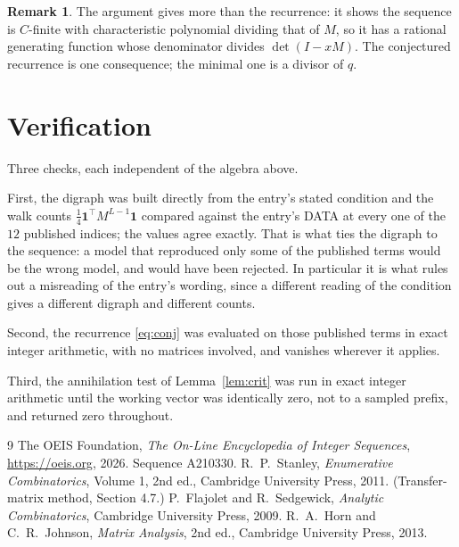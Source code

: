 \documentclass[11pt,a4paper]{article}
\theoremstyle{plain}
\theoremstyle{definition}
\newtheorem{remark}[theorem]{Remark}
\begin{document}
\begin{remark}
The argument gives more than the recurrence: it shows the sequence is $C$-finite with
characteristic polynomial dividing that of $M$, so it has a rational generating function
whose denominator divides $\det(I-xM)$. The conjectured recurrence is one consequence; the
minimal one is a divisor of $q$.
\end{remark}

\section{Verification}

Three checks, each independent of the algebra above.

First, the digraph was built directly from the entry's stated condition and the walk counts
$\tfrac1{4}\mathbf{1}^{\!\top}M^{L-1}\mathbf{1}$ compared against the entry's DATA at
every one of the $12$ published indices; the values agree exactly. That is what ties
the digraph to the sequence: a model that reproduced only some of the published terms would
be the wrong model, and would have been rejected. In particular it is what rules out a
misreading of the entry's wording, since a different reading of the condition gives a
different digraph and different counts.

Second, the recurrence \eqref{eq:conj} was evaluated on those published terms in exact
integer arithmetic, with no matrices involved, and vanishes wherever it applies.

Third, the annihilation test of Lemma~\ref{lem:crit} was run in exact integer arithmetic
until the working vector was identically zero, not to a sampled prefix, and returned zero
throughout.

\begin{thebibliography}{9}
 The OEIS Foundation, \emph{The On-Line Encyclopedia of Integer
Sequences}, \url{https://oeis.org}, 2026. Sequence A210330.
 R.~P.~Stanley, \emph{Enumerative Combinatorics}, Volume 1, 2nd ed.,
Cambridge University Press, 2011. (Transfer-matrix method, Section 4.7.)
 P.~Flajolet and R.~Sedgewick, \emph{Analytic Combinatorics}, Cambridge
University Press, 2009.
 R.~A.~Horn and C.~R.~Johnson, \emph{Matrix Analysis}, 2nd ed., Cambridge
University Press, 2013.
\end{thebibliography}
\end{document}
